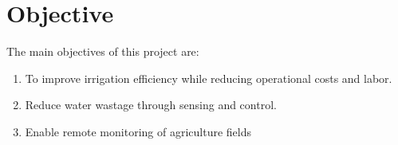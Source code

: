 \chapter{Objective}
The main objectives of this project are:
\begin{enumerate}
	\item To improve irrigation efficiency while reducing operational
		costs and labor.
	\item Reduce water wastage through sensing and control.
	\item Enable remote monitoring of agriculture fields
\end{enumerate}
